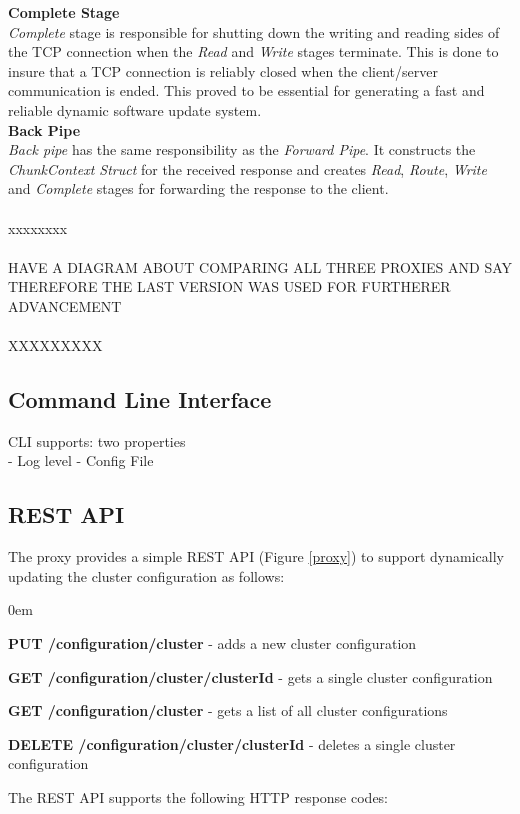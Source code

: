 \documentclass[a4paper,11pt,twoside]{article}
\begin{document}
\noindent
\textbf{Complete Stage}\\ 
\textit{Complete} stage is responsible for shutting down the writing and reading sides of the TCP connection when the \textit{Read} and \textit{Write} stages terminate. This is done to insure that a TCP connection is reliably closed when the client/server communication is ended. This proved to be essential for generating a fast and reliable dynamic software update system.\\
 
\noindent
\textbf{Back Pipe} \\
\textit{Back pipe} has the same responsibility as the \textit{Forward Pipe}. It constructs the \textit{ChunkContext Struct} for the received response and creates \textit{Read}, \textit{Route}, \textit{Write} and \textit{Complete} stages for forwarding the response to the client.\\\\

xxxxxxxx\\\\
HAVE A DIAGRAM ABOUT COMPARING ALL THREE PROXIES AND SAY THEREFORE THE LAST VERSION WAS USED FOR FURTHERER ADVANCEMENT\\\\

XXXXXXXXX\\

\subsection{Command Line Interface}
CLI supports: two properties \\

-	Log level
- Config File


\subsection{REST API}
The proxy provides a simple REST API (Figure \ref{proxy}) to support dynamically updating the cluster configuration as follows:

\begin{list}{-}{}
  \itemsep0em
  \item\textbf{{PUT /configuration/cluster}} - adds a new cluster configuration
  
  \item\textbf{{GET /configuration/cluster/{clusterId}}} -  gets a single cluster configuration
  
   \item\textbf{{GET /configuration/cluster}} - gets a list of all cluster configurations
   
   \item\textbf{{DELETE /configuration/cluster/{clusterId}}} -  deletes a single cluster configuration
  
\end{list}
\noindent
The REST API supports the following HTTP response codes:
\end{document}
